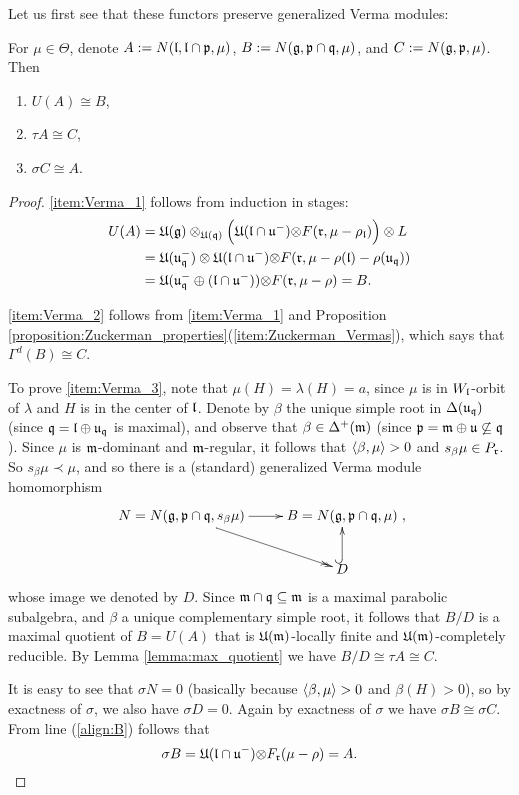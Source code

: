 \documentclass[a4paper,10pt]{article}
\begin{document}
Let us first see that these functors preserve generalized Verma modules:

\begin{lemma}
\label{lemma:tau_sigma_Vermas}
For $\mu \in \Theta$, denote $A:= N(\mathfrak{l,l\cap p},\mu)$, $B:= N(\mathfrak{g,p\cap q},\mu)$, and $C:= N(\mathfrak{g,p},\mu)$. Then
\begin{enumerate}
\item \label{item:Verma_1} $U(A) \cong B$,
\item \label{item:Verma_2} $\tau A \cong C$,
\item \label{item:Verma_3} $\sigma C \cong A$.
\end{enumerate}
\end{lemma}
%
\begin{proof}
\ref{item:Verma_1} follows from induction in stages:
%
\begin{align}
\nonumber U(A) &= \mathfrak{U(g) \otimes_{U(q)} \Big( U(l \cap u^-) \otimes} F(\mathfrak{r},\mu - \rho_{\mathfrak{l}}) \Big) \otimes L \\
\nonumber &= \mathfrak{U(u_q^-) \otimes U(l \cap u^-) \otimes} F(\mathfrak{r},\mu - \rho(\mathfrak{l})- \rho(\mathfrak{u_q})) \\
\label{align:B} &= \mathfrak{U(u_q^- \oplus (l \cap u^-)) \otimes } F(\mathfrak{r},\mu - \rho) = B.
\end{align}

\ref{item:Verma_2} follows from \ref{item:Verma_1} and Proposition \ref{proposition:Zuckerman_properties}(\ref{item:Zuckerman_Vermas}), which says that $\Gamma^d(B) \cong C$.

To prove \ref{item:Verma_3}, note that $\mu(H)=\lambda(H)=a$, since $\mu$ is in $W_{\mathfrak{l}}$-orbit of $\lambda$ and $H$ is in the center of $\mathfrak{l}$. Denote by $\beta$ the unique simple root in $\Delta(\mathfrak{u_q})$ (since $\mathfrak{q = l \oplus u_q}$ is maximal), and observe that $\beta \in \Delta^+(\mathfrak{m})$ (since $\mathfrak{p=m \oplus u \not\subseteq q}$). Since $\mu$ is $\mathfrak{m}$-dominant and $\mathfrak{m}$-regular, it follows that $\langle \beta, \mu \rangle>0$ and $s_\beta \mu \in P_{\mathfrak{r}}$. So $s_\beta \mu \prec \mu$, and so there is a (standard) generalized Verma module homomorphism
%
\[ \xymatrix{ N=N(\lie{g,p\cap q},s_\beta \mu) \ar[r] \ar@{->>}[rd] & B=N(\lie{g,p\cap q},\mu) \\ & D \ar@{^{(}->}[u]}, \]
%
whose image we denoted by $D$. Since $\mathfrak{m \cap q \subseteq m}$ is a maximal parabolic subalgebra, and $\beta$ a unique complementary simple root,  it follows  that $B/D$ is a maximal quotient of $B=U(A)$ that is $\mathfrak{U(m)}$-locally finite and $\mathfrak{U(m)}$-completely reducible. By Lemma \ref{lemma:max_quotient} we have $B/D \cong \tau A \cong C$.

It is easy to see that $\sigma N =0$ (basically because $\langle \beta, \mu \rangle>0$ and $\beta(H)>0$), so by exactness of $\sigma$, we also have $\sigma D=0$. Again by exactness of $\sigma$ we have $\sigma B \cong \sigma C$. From line (\ref{align:B}) follows that \[ \sigma B = \mathfrak{U(l \cap u^-) \otimes } F_{\mathfrak{r}}(\mu - \rho)=A.  \qedhere \]
\end{proof}
\end{document}
